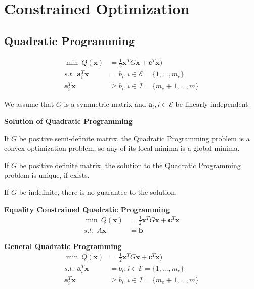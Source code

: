 \documentclass[runningheads]{llncs}
\begin{document}
\clearpage
\section{Constrained Optimization}
\subsection{Quadratic Programming}

\begin{align}
    \min \ Q(\mathbf{x}) &= \frac{1}{2}\mathbf{x}^T G\mathbf{x} + \mathbf{c}^T \mathbf{x}) \\
    s.t. \ \ \mathbf{a}_i^T \mathbf{x} &= b_i, i \in \mathcal{E} = \{1,...,m_e \} \\
    \mathbf{a}_i^T \mathbf{x} &\geq b_i, i \in \mathcal{I} = \{m_e+1,...,m \}
\end{align}

We assume that $G$ is a symmetric matrix and $\mathbf{a}_i, i \in \mathcal{E}$
be linearly independent.

\par
\noindent\textbf{Solution of Quadratic Programming}
\par
If $G$ be positive semi-definite matrix, the 
Quadratic Programming problem is a convex optimization
problem, so any of its local minima is a global minima.
\par
If $G$ be positive definite matrix, the
solution to the Quadratic Programming problem
is unique, if exists.
\par
If $G$ be indefinite, there is no guarantee to the solution.

\par
\noindent\textbf{Equality Constrained Quadratic Programming}
\begin{align}
    \min \ Q(\mathbf{x}) &= \frac{1}{2}\mathbf{x}^T G\mathbf{x} + \mathbf{c}^T \mathbf{x} \\
    s.t. \ \ A \mathbf{x} &= \mathbf{b}
\end{align}

\par
\noindent\textbf{General Quadratic Programming}
\begin{align}
    \min \ Q(\mathbf{x}) &= \frac{1}{2}\mathbf{x}^T G\mathbf{x} + \mathbf{c}^T \mathbf{x}) \\
    s.t. \ \ \mathbf{a}_i^T \mathbf{x} &= b_i, i \in \mathcal{E} = \{1,...,m_e \} \\
    \mathbf{a}_i^T \mathbf{x} &\geq b_i, i \in \mathcal{I} = \{m_e+1,...,m \}
\end{align}
\end{document}
